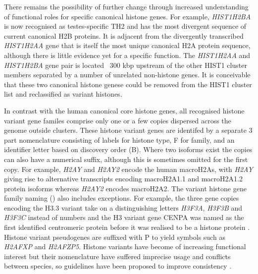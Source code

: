 	There remains the possibility of further change 
	through increased understanding of functional roles for specific canonical histone genes. 
	For example, \textit{HIST1H2BA} is now recognised as testes-specific TH2  
	and has the most divergent sequence of current canonical H2B proteins.
	It is adjacent from the divergently transcribed \textit{HIST1H2AA} gene 
	that is itself the most unique canonical H2A protein sequence, 
	although there is little evidence yet for a specific function. 
	The \textit{HIST1H2AA} and \textit{HIST1H2BA} gene pair 
	is located ~300 kbp upstream of the other HIST1 cluster members 
	separated by a number of unrelated non-histone genes. 
	It is conceivable that these two canonical histone genese
	could be removed from the HIST1 cluster list and reclassified as variant histones.
	
	In contrast with the human canonical core histone genes, 
	all recognised histone variant gene familes comprise only one or a few copies 
	dispersed across the genome outside clusters.
	These histone variant genes are identifed by a separate 3 part nomenclature 
	consisting of labels for histone type, F for family, 
	and an identifier letter based on discovery order (B).
	Where two isoforms exist the copies can also have a numerical suffix, 
	although this is sometimes omitted for the first copy. 
	For example, \textit{H2AY} and \textit{H2AY2} encode the human macroH2As, 
	with \textit{H2AY} giving rise to alternative transcripts encoding macroH2A1.1 and macroH2A1.2 protein isoforms 
	whereas \textit{H2AY2} encodes macroH2A2.
	The variant histone gene family naming () also includes exceptions. 
	For example, the three gene copies encoding the H3.3 variant 
	take on a distinguishing letters \textit{H3F3A}, \textit{H3F3B} and \textit{H3F3C} instead of numbers 
	and the H3 variant gene CENPA  was named as the first identified centromeric protein \cite{CENPA-first-report} 
	before it was realised to be a histone protein \citep{CENPA-copurifies-histones, CENPA-sequence-analysis}. 
	Histone variant pseudogenes are suffixed with P to yield symbols such as \textit{H2AFXP} and \textit{H2AFZP5}.
	Histone variants have become of increasing functional interest 
	but their nomenclature have suffered imprecise usage and conflicts between species, 
	so guidelines have been proposed to improve consistency .

